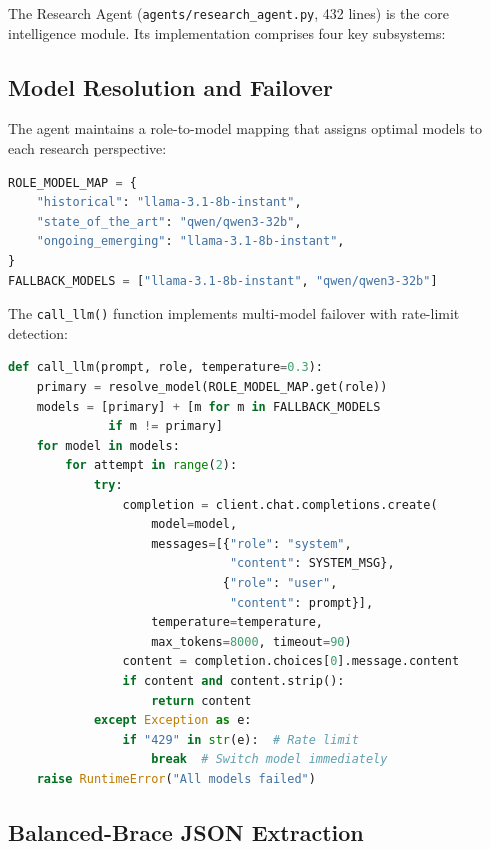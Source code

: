 The Research Agent (\texttt{agents/research\_agent.py}, 432 lines) is the core intelligence module. Its implementation comprises four key subsystems:

\subsection{Model Resolution and Failover}

The agent maintains a role-to-model mapping that assigns optimal models to each research perspective:

\begin{lstlisting}[language=Python, caption={Model Configuration}, label={lst:model_config}]
ROLE_MODEL_MAP = {
    "historical": "llama-3.1-8b-instant",
    "state_of_the_art": "qwen/qwen3-32b",
    "ongoing_emerging": "llama-3.1-8b-instant",
}
FALLBACK_MODELS = ["llama-3.1-8b-instant", "qwen/qwen3-32b"]
\end{lstlisting}

The \texttt{call\_llm()} function implements multi-model failover with rate-limit detection:

\begin{lstlisting}[language=Python, caption={LLM Call with Failover (Simplified)}, label={lst:call_llm}]
def call_llm(prompt, role, temperature=0.3):
    primary = resolve_model(ROLE_MODEL_MAP.get(role))
    models = [primary] + [m for m in FALLBACK_MODELS
              if m != primary]
    for model in models:
        for attempt in range(2):
            try:
                completion = client.chat.completions.create(
                    model=model,
                    messages=[{"role": "system",
                               "content": SYSTEM_MSG},
                              {"role": "user",
                               "content": prompt}],
                    temperature=temperature,
                    max_tokens=8000, timeout=90)
                content = completion.choices[0].message.content
                if content and content.strip():
                    return content
            except Exception as e:
                if "429" in str(e):  # Rate limit
                    break  # Switch model immediately
    raise RuntimeError("All models failed")
\end{lstlisting}

\subsection{Balanced-Brace JSON Extraction}

